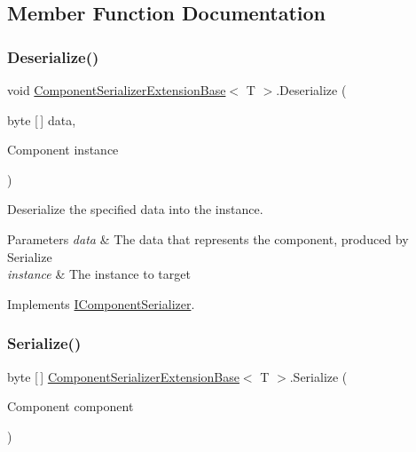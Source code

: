 \subsection{Member Function Documentation}
\mbox{\label{class_component_serializer_extension_base_a003b02386876cd68c588aef276124b0c}} 
\subsubsection{\texorpdfstring{Deserialize()}{Deserialize()}}
{\footnotesize\ttfamily void \hyperlink{class_component_serializer_extension_base}{Component\+Serializer\+Extension\+Base}$<$ T $>$.Deserialize (\begin{DoxyParamCaption}\item[{byte \mbox{[}$\,$\mbox{]}}]{data,  }\item[{Component}]{instance }\end{DoxyParamCaption})\hspace{0.3cm}{\ttfamily [inline]}}



Deserialize the specified data into the instance. 


\begin{DoxyParams}{Parameters}
{\em data} & The data that represents the component, produced by Serialize \\
\hline
{\em instance} & The instance to target \\
\hline
\end{DoxyParams}


Implements \hyperlink{interface_i_component_serializer_a4cc366a5c78b33d47a90c209d8fed883}{I\+Component\+Serializer}.

\mbox{\label{class_component_serializer_extension_base_a068c9a1c5f90967de5d22bf9357cfca0}} 
\subsubsection{\texorpdfstring{Serialize()}{Serialize()}}
{\footnotesize\ttfamily byte \mbox{[}$\,$\mbox{]} \hyperlink{class_component_serializer_extension_base}{Component\+Serializer\+Extension\+Base}$<$ T $>$.Serialize (\begin{DoxyParamCaption}\item[{Component}]{component }\end{DoxyParamCaption})\hspace{0.3cm}{\ttfamily [inline]}}




